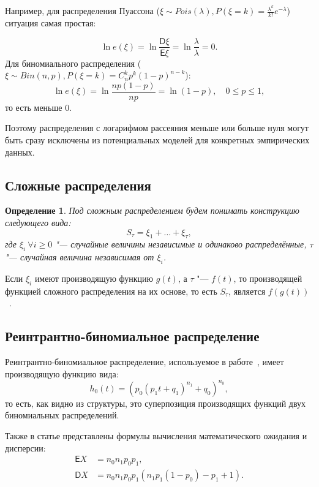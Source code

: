 \documentclass[12pt, specialist, subf, substylefile = spbu.rtx]{disser}
\newtheorem{define}{Определение}
\begin{document}
	Например, для распределения Пуассона ($ \xi \sim Pois(\lambda), P (\xi = k) = \frac {\lambda ^ k} {k !} e ^{-\lambda} $) ситуация самая простая:
	
	\[
		\ln e (\xi) = \ln \frac {\mathsf{D} \xi} {\mathsf{E} \xi} = \ln \frac \lambda \lambda = 0.
	\]
	Для биномиального распределения ($ \xi \sim Bin(n, p), P (\xi = k) = C ^k _n p ^k (1 - p) ^{n - k} $):
	\[
		\ln e (\xi) = \ln \frac {n p (1 - p)} {np} = \ln (1 - p), \quad 0 \leqslant p \leqslant 1,
	\]
	то есть меньше $ 0 $.
	
	Поэтому распределения с логарифмом рассеяния меньше или больше нуля могут быть сразу исключены из потенциальных моделей для конкретных эмпирических данных.
	
	\subsection{Сложные распределения}
	
	\begin{define}
		Под сложным распределением будем понимать конструкцию следующего вида:
		\[
			S _\tau = \xi _1 + \dots + \xi _\tau,
		\]
		где $\xi _i~ \forall i \geqslant 0$ "--- случайные величины независимые и одинаково распределённые, $\tau$ "--- случайная величина независимая от $\xi _i$.
		\label{def:harddistr}
	\end{define}

	Если $\xi _i$ имеют производящую функцию $g(t)$, а $\tau$ "---  $f(t)$, то производящей функцией сложного распределения на их основе, то есть $S _\tau$, является $f(g(t))$~\cite{bib:feller1952}.
	
	\subsection{Реинтрантно-биномиальное распределение}
	
	Реинтрантно-биномиальное распределение, используемое в работе~\cite{bib:alexeeva2008}, имеет производящую функцию вида:
	\[
		h _0 (t) = (p _0(p _1 t + q _1) ^{n _1} + q _0) ^{n _0},
	\]
	то есть, как видно из структуры, это суперпозиция производящих функций двух биномиальных распределений.
	
	Также в статье представлены формулы вычисления математического ожидания и дисперсии:
	\begin{align*}
		\mathsf{E} X &= n _0 n _1 p _0 p_1,\\
		\mathsf{D} X &= n _0 n _1 p _0 p_1(n _1 p _1(1 - p _0) - p _1 + 1).
	\end{align*}
\end{document}
